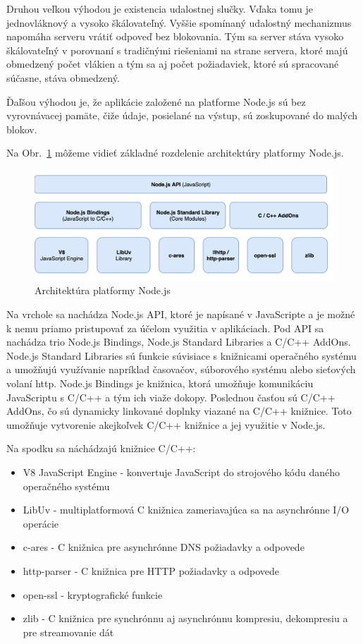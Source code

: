 \indent Druhou veľkou výhodou je existencia udalostnej slučky. Vďaka tomu je jednovláknový a vysoko škálovateľný. Vyššie spomínaný udalostný mechanizmus napomáha serveru vrátiť odpoveď bez blokovania. Tým sa server stáva vysoko škálovateľný v porovnaní s tradičnými riešeniami na strane servera, ktoré majú obmedzený počet vlákien a tým sa aj počet požiadaviek, ktoré sú spracované súčasne, stáva obmedzený. 

\indent Ďaľšou výhodou je, že aplikácie založené na platforme Node.js sú bez vyrovnávacej pamäte, čiže údaje, posielané na výstup, sú zoskupované do malých blokov.

\indent Na Obr.~\ref{fig:node_arch} môžeme vidieť základné rozdelenie architektúry platformy Node.js. 

\begin{figure}[H]
    \centering
    \includegraphics[scale=0.30]{img/node_architecture.png}
    \caption{Architektúra platformy Node.js\cite{nodejs_3}}
    \label{fig:node_arch}
\end{figure}

\indent Na vrchole sa nachádza Node.js API, ktoré je napísané v JavaScripte a je možné k nemu priamo pristupovať za účelom využitia v aplikáciach. Pod API sa nachádza trio Node.js Bindings, Node.js Standard Libraries a C/C++ AddOns. Node.js Standard Libraries sú funkcie súvisiace s knižnicami operačného systému a umožňujú využívanie napríklad časovačov, súborového systému alebo sieťových volaní http. Node.js Bindings je knižnica, ktorá umožňuje komunikáciu JavaScriptu s C/C++ a tým ich viaže dokopy. Poslednou časťou sú C/C++ AddOns, čo sú dynamicky linkované doplnky viazané na C/C++ knižnice. Toto umožňuje vytvorenie akejkoľvek C/C++ knižnice a jej využitie v Node.js\cite{nodejs_3,nodejs_4}. 

\indent Na spodku sa náchádzajú knižnice C/C++:
\begin{itemize}
    \item V8 JavaScript Engine - konvertuje JavaScript do strojového kódu daného operačného systému
    \item LibUv - multiplatformová C knižnica zameriavajúca sa na asynchrónne I/O operácie
    \item c-ares - C knižnica pre asynchrónne DNS požiadavky a odpovede
    \item http-parser - C knižnica pre HTTP požiadavky a odpovede
    \item open-ssl - kryptografické funkcie
    \item zlib - C knižnica pre synchrónnu aj asynchrónnu kompresiu, dekompresiu a pre streamovanie dát 
\end{itemize}

